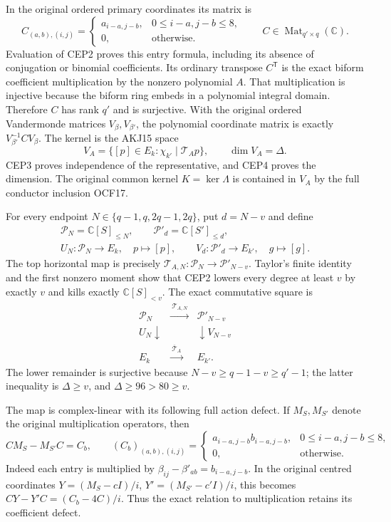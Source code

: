 \documentclass[11pt,a4paper]{article}
\begin{document}
In the original ordered primary coordinates its matrix is
\[
 C_{(a,b),(i,j)}
 =\begin{cases}
 a_{i-a,j-b},&0\le i-a,j-b\le8,\\
 0,&\text{otherwise}.
 \end{cases}
 \qquad C\in\operatorname{Mat}_{q'\times q}(\mathbb C).
 \tag{CEP4}
\]
Evaluation of CEP2 proves this entry formula, including its absence
of conjugation or binomial coefficients. Its ordinary transpose
$C^{\mathsf T}$ is the exact biform coefficient multiplication
by the nonzero polynomial $A$. That multiplication is injective
because the biform ring embeds in a polynomial integral domain.
Therefore $C$ has rank $q'$ and is surjective. With the original
ordered Vandermonde matrices $V_\beta,V_{\beta'}$, the polynomial
coordinate matrix is exactly $V_{\beta'}^{-1}CV_\beta$.
The kernel is the AKJ15 space
\[
 V_A=\{[p]\in E_k:\chi_{k'}\mid\mathcal T_Ap\},
 \qquad \dim V_A=\Delta.
 \tag{CEP5}
\]
CEP3 proves independence of the representative, and CEP4 proves
the dimension. The original common kernel $K=\ker\Lambda$ is
contained in $V_A$ by the full conductor inclusion OCF17.

For every endpoint
$N\in\{q-1,q,2q-1,2q\}$, put $d=N-v$ and define
\[
 \begin{gathered}
 \mathcal P_N=\mathbb C[S]_{\le N},\qquad
 \mathcal P'_d=\mathbb C[S']_{\le d},\\
 U_N:\mathcal P_N\longrightarrow E_k,\quad p\longmapsto[p],
 \qquad
 V_d:\mathcal P'_d\longrightarrow E_{k'},\quad g\longmapsto[g].
 \end{gathered}
\]
The top horizontal map is precisely
$\mathcal T_{A,N}:\mathcal P_N\longrightarrow\mathcal P'_{N-v}$.
Taylor's finite identity and the first nonzero moment show that
CEP2 lowers every degree at least $v$ by exactly $v$ and kills
exactly $\mathbb C[S]_{<v}$. The exact commutative square is
\[
 \begin{array}{ccc}
 \mathcal P_N &\xrightarrow{\ \mathcal T_{A,N}\ }&\mathcal P'_{N-v}\\
 {\scriptstyle U_N}\downarrow&&\downarrow{\scriptstyle V_{N-v}}\\
 E_k&\xrightarrow{\ \overline{\mathcal T}_A\ }&E_{k'} .
 \end{array}\tag{CEP6}
\]
The lower remainder is surjective because
$N-v\ge q-1-v\ge q'-1$; the latter inequality is
$\Delta\ge v$, and $\Delta\ge96>80\ge v$.

The map is complex-linear with its following full action defect.
If $M_S,M_{S'}$ denote the original multiplication operators, then
\[
 CM_S-M_{S'}C=C_b,\qquad
 (C_b)_{(a,b),(i,j)}=
 \begin{cases}a_{i-a,j-b}b_{i-a,j-b},&0\le i-a,j-b\le8,\\
 0,&\text{otherwise}.
 \end{cases}
 \tag{CEP7}
\]
Indeed each entry is multiplied by
$\beta_{ij}-\beta'_{ab}=b_{i-a,j-b}$. In the original centred
coordinates $Y=(M_S-cI)/i$, $Y'=(M_{S'}-c'I)/i$, this becomes
$CY-Y'C=(C_b-4C)/i$. Thus the exact relation to multiplication
retains its coefficient defect.
\end{document}
